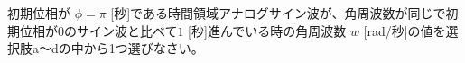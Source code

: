 初期位相が $\phi=\pi$ [秒]である時間領域アナログサイン波が、角周波数が同じで初期位相が$0$のサイン波と比べて$1$ [秒]進んでいる時の角周波数 $w$ [rad/秒]の値を選択肢a〜dの中から1つ選びなさい。
